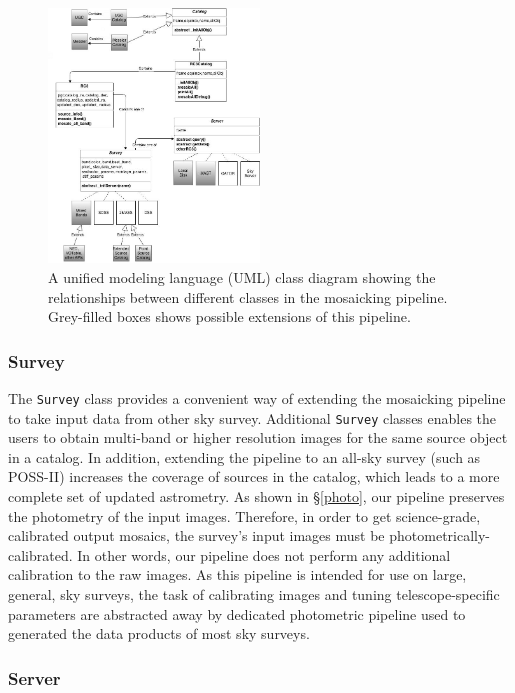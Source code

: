 \documentclass[authoryear, 12pt, 5p, times]{elsarticle}
\begin{document}
\begin{figure}[h]
\includegraphics[width=0.5\textwidth]{figures/hierarchy}
\caption{A unified modeling language (UML) class diagram showing the relationships between different classes in the mosaicking pipeline. Grey-filled boxes shows possible extensions of this pipeline.
\label{fig:hierarchy}
}
\end{figure}
\subsubsection{Survey \label{sec:survey}}
The \texttt{Survey} class provides a convenient way of extending the mosaicking pipeline to take input data from other sky survey. Additional  \texttt{Survey} classes enables the users to obtain multi-band or higher resolution images for the same source object in a catalog.  In addition, extending the pipeline to an all-sky survey (such as POSS-II) increases the coverage of sources in the catalog, which leads to a more complete set of updated astrometry.  As shown in \S\ref{photo}, our pipeline preserves the photometry of the  input images.  Therefore, in order to get science-grade, calibrated output mosaics, the survey's input images must be photometrically-calibrated. In other words, our pipeline does not perform any additional calibration to the raw images. As this pipeline is intended for use on large, general, sky surveys, the task of calibrating images and tuning telescope-specific parameters are abstracted away by dedicated photometric pipeline used to generated the data products of most sky surveys. 
\subsubsection{Server\label{sec:server}}
\end{document}
